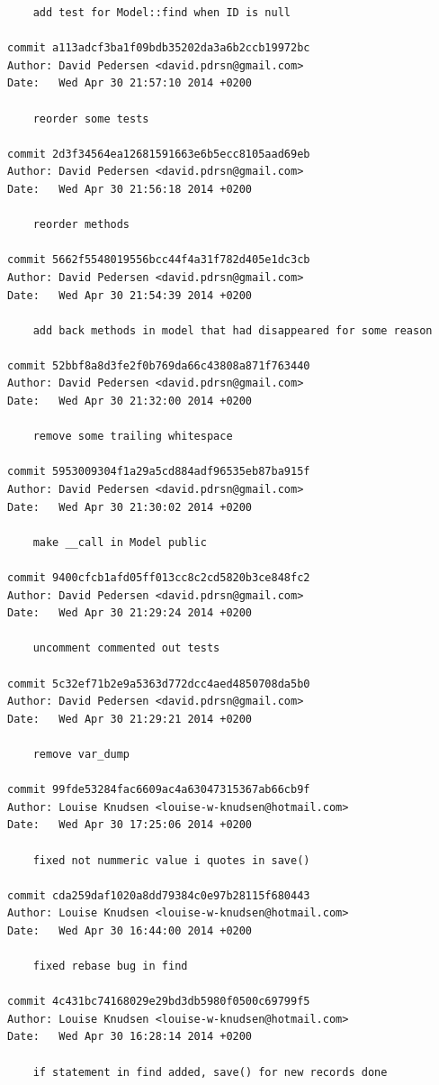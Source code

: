 \documentclass[12pt]{article}
\begin{document}
\begin{verbatim}
    add test for Model::find when ID is null

commit a113adcf3ba1f09bdb35202da3a6b2ccb19972bc
Author: David Pedersen <david.pdrsn@gmail.com>
Date:   Wed Apr 30 21:57:10 2014 +0200

    reorder some tests

commit 2d3f34564ea12681591663e6b5ecc8105aad69eb
Author: David Pedersen <david.pdrsn@gmail.com>
Date:   Wed Apr 30 21:56:18 2014 +0200

    reorder methods

commit 5662f5548019556bcc44f4a31f782d405e1dc3cb
Author: David Pedersen <david.pdrsn@gmail.com>
Date:   Wed Apr 30 21:54:39 2014 +0200

    add back methods in model that had disappeared for some reason

commit 52bbf8a8d3fe2f0b769da66c43808a871f763440
Author: David Pedersen <david.pdrsn@gmail.com>
Date:   Wed Apr 30 21:32:00 2014 +0200

    remove some trailing whitespace

commit 5953009304f1a29a5cd884adf96535eb87ba915f
Author: David Pedersen <david.pdrsn@gmail.com>
Date:   Wed Apr 30 21:30:02 2014 +0200

    make __call in Model public

commit 9400cfcb1afd05ff013cc8c2cd5820b3ce848fc2
Author: David Pedersen <david.pdrsn@gmail.com>
Date:   Wed Apr 30 21:29:24 2014 +0200

    uncomment commented out tests

commit 5c32ef71b2e9a5363d772dcc4aed4850708da5b0
Author: David Pedersen <david.pdrsn@gmail.com>
Date:   Wed Apr 30 21:29:21 2014 +0200

    remove var_dump

commit 99fde53284fac6609ac4a63047315367ab66cb9f
Author: Louise Knudsen <louise-w-knudsen@hotmail.com>
Date:   Wed Apr 30 17:25:06 2014 +0200

    fixed not nummeric value i quotes in save()

commit cda259daf1020a8dd79384c0e97b28115f680443
Author: Louise Knudsen <louise-w-knudsen@hotmail.com>
Date:   Wed Apr 30 16:44:00 2014 +0200

    fixed rebase bug in find

commit 4c431bc74168029e29bd3db5980f0500c69799f5
Author: Louise Knudsen <louise-w-knudsen@hotmail.com>
Date:   Wed Apr 30 16:28:14 2014 +0200

    if statement in find added, save() for new records done


\end{verbatim}
\end{document}
